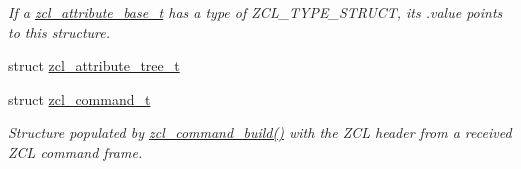 \begin{DoxyCompactItemize}
\begin{DoxyCompactList}\small\item\em If a \hyperlink{structzcl__attribute__base__t}{zcl\+\_\+attribute\+\_\+base\+\_\+t} has a type of Z\+C\+L\+\_\+\+T\+Y\+P\+E\+\_\+\+S\+T\+R\+U\+CT, its .value points to this structure. \end{DoxyCompactList}\item 
struct \hyperlink{structzcl__attribute__tree__t}{zcl\+\_\+attribute\+\_\+tree\+\_\+t}
\item 
struct \hyperlink{structzcl__command__t}{zcl\+\_\+command\+\_\+t}
\begin{DoxyCompactList}\small\item\em Structure populated by \hyperlink{group__zcl_gadeb35ab493fffec9ba1c33f658929136}{zcl\+\_\+command\+\_\+build()} with the Z\+CL header from a received Z\+CL command frame. \end{DoxyCompactList}\end{DoxyCompactItemize}
